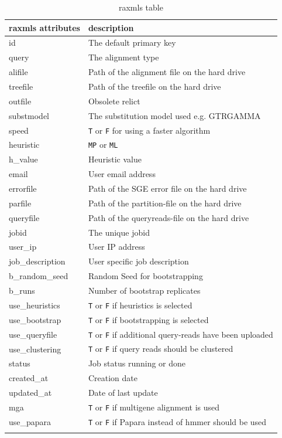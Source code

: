 \documentclass{scrartcl}
\begin{document}
		\begin{table}[]
			\caption{raxmls table}
			\label{tab:raxmls}
			\begin{tabular}[c]{l|l}
				\hline \textbf{raxmls attributes} & \textbf{description} \\	
				\hline id & The default primary key \\
				query & The alignment type\\
				alifile & Path of the alignment file on the hard drive\\
				treefile & Path of the treefile on the hard drive \\
				outfile & Obsolete relict\\
				substmodel & The substitution model used e.g. GTRGAMMA \\
				speed  &  \texttt{T} or \texttt{F} for using a faster algorithm\\
				heuristic & \texttt{MP} or \texttt{ML}\\
				h\_value & Heuristic value\\
				email & User email address \\
				errorfile & Path of the SGE error file on the hard drive\\
				parfile & Path of the partition-file on the hard drive\\ 
				queryfile & Path of the queryreads-file on the hard drive\\
				jobid & The unique jobid\\
				user\_ip & User IP address\\
				job\_description & User specific job description\\
				b\_random\_seed  & Random Seed for bootstrapping\\
				b\_runs & Number of bootstrap replicates \\
				use\_heuristics & \texttt{T} or \texttt{F} if heuristics is selected\\
				use\_bootstrap & \texttt{T} or \texttt{F} if bootstrapping is selected\\
				use\_queryfile & \texttt{T} or \texttt{F} if additional query-reads have been uploaded\\
				use\_clustering & \texttt{T} or \texttt{F} if query reads should be clustered\\
				status & Job status running or done\\
				created\_at & Creation date\\
				updated\_at & Date of last update\\
				mga & \texttt{T} or \texttt{F} if multigene alignment is used\\
				use\_papara & \texttt{T} or \texttt{F} if Papara instead of hmmer should be used \\
				\\\hline
			\end{tabular}
		\end{table}
		
\end{document}
